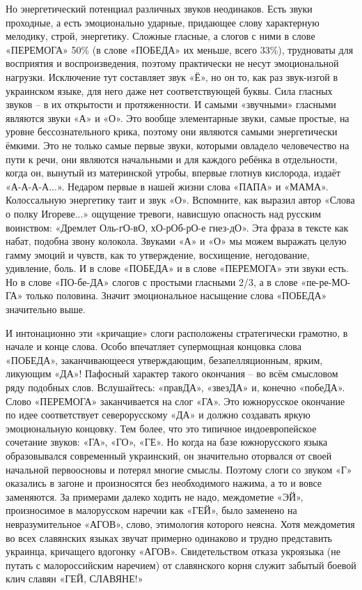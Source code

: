 Но энергетический потенциал различных звуков неодинаков. Есть звуки проходные,
а есть эмоционально ударные, придающее слову характерную мелодику, строй,
энергетику. Сложные гласные, а слогов с ними в слове «ПЕРЕМОГА» 50\% (в слове
«ПОБЕДА» их меньше, всего 33\%), трудноваты для восприятия и воспроизведения,
поэтому практически не несут эмоциональной нагрузки. Исключение тут составляет
звук «Ё», но он то, как раз звук-изгой в украинском языке, для него даже нет
соответствующей буквы. Сила гласных звуков – в их открытости и протяженности. И
самыми «звучными» гласными являются звуки «А» и «О». Это вообще элементарные
звуки, самые простые, на уровне бессознательного крика, поэтому они являются
самыми энергетически ёмкими. Это не только самые первые звуки, которыми
овладело человечество на пути к речи, они являются начальными и для каждого
ребёнка в отдельности, когда он, вынутый из материнской утробы, впервые глотнув
кислорода, издаёт «А-А-А-А...».  Недаром первые в нашей жизни слова «ПАПА» и
«МАМА». Колоссальную энергетику таит и звук «О». Вспомните, как выразил автор
«Слова о полку Игореве...» ощущение тревоги, нависшую опасность над русским
воинством: «Дремлет Оль-гО-вО, хО-рОб-рО-е гнез-дО». Эта фраза в тексте как
набат, подобна звону колокола. Звуками «А» и «О» мы можем выражать целую гамму
эмоций и чувств, как то утверждение, восхищение, негодование, удивление, боль.
И в слове «ПОБЕДА» и в слове «ПЕРЕМОГА» эти звуки есть. Но в слове «ПО-бе-ДА»
слогов с простыми гласными 2/3, а в слове «пе-ре-МО-ГА» только половина. Значит
эмоциональное насыщение слова «ПОБЕДА» значительно выше.

И интонационно эти «кричащие» слоги расположены стратегически грамотно, в
начале и конце слова. Особо впечатляет супермощная концовка слова «ПОБЕДА»,
заканчивающееся утверждающим, безапелляционным, ярким, ликующим «ДА»!  Пафосный
характер такого окончания – во всём смысловом ряду подобных слов. Вслушайтесь:
«правДА», «звезДА» и, конечно «побеДА». Слово «ПЕРЕМОГА» заканчивается на слог
«ГА». Это южнорусское окончание по идее соответствует северорусскому «ДА» и
должно создавать яркую эмоциональную концовку. Тем более, что это типичное
индоевропейское сочетание звуков: «ГА», «ГО», «ГЕ». Но когда на базе
южнорусского языка образовывался современный украинский, он значительно
оторвался от своей начальной первоосновы и потерял многие смыслы. Поэтому слоги
со звуком «Г» оказались в загоне и произносятся без необходимого нажима, а то и
вовсе заменяются. За примерами далеко ходить не надо, междометие «ЭЙ»,
произносимое в малорусском наречии как «ГЕЙ», было заменено на невразумительное
«АГОВ», слово, этимология которого неясна. Хотя междометия во всех славянских
языках звучат примерно одинаково и трудно представить украинца, кричащего
вдогонку «АГОВ». Свидетельством отказа укроязыка (не путать с малороссийским
наречием) от славянского корня служит забытый боевой клич славян «ГЕЙ,
СЛАВЯНЕ!»

